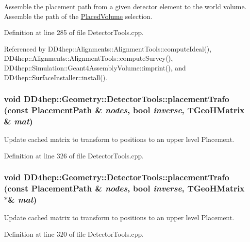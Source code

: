 Assemble the placement path from a given detector element to the world volume. Assemble the path of the \hyperlink{class_d_d4hep_1_1_geometry_1_1_placed_volume}{PlacedVolume} selection. 

Definition at line 285 of file DetectorTools.cpp.

Referenced by DD4hep::Alignments::AlignmentTools::computeIdeal(), DD4hep::Alignments::AlignmentTools::computeSurvey(), DD4hep::Simulation::Geant4AssemblyVolume::imprint(), and DD4hep::SurfaceInstaller::install().\hypertarget{namespace_d_d4hep_1_1_geometry_1_1_detector_tools_a33a0bf01d4cc18da281b63e2e865c97a}{
\subsubsection[{placementTrafo}]{\setlength{\rightskip}{0pt plus 5cm}void DD4hep::Geometry::DetectorTools::placementTrafo (const {\bf PlacementPath} \& {\em nodes}, \/  bool {\em inverse}, \/  TGeoHMatrix \& {\em mat})}}
\label{namespace_d_d4hep_1_1_geometry_1_1_detector_tools_a33a0bf01d4cc18da281b63e2e865c97a}


Update cached matrix to transform to positions to an upper level Placement. 

Definition at line 326 of file DetectorTools.cpp.\hypertarget{namespace_d_d4hep_1_1_geometry_1_1_detector_tools_a08fe6233324d561934a33569d4548435}{
\subsubsection[{placementTrafo}]{\setlength{\rightskip}{0pt plus 5cm}void DD4hep::Geometry::DetectorTools::placementTrafo (const {\bf PlacementPath} \& {\em nodes}, \/  bool {\em inverse}, \/  TGeoHMatrix $\ast$\& {\em mat})}}
\label{namespace_d_d4hep_1_1_geometry_1_1_detector_tools_a08fe6233324d561934a33569d4548435}


Update cached matrix to transform to positions to an upper level Placement. 

Definition at line 320 of file DetectorTools.cpp.

